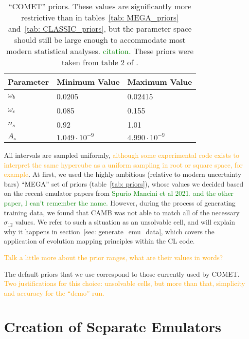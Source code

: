 \begin{table}[ht!]
\centering
\begin{tabular}{l|l|l}
\hline
Parameter & Minimum Value & Maximum Value \\ \hline
$\omega_b$ & 0.0205 & 0.02415 \\
$\omega_c$ & 0.085 & 0.155 \\
$n_s$ & 0.92 & 1.01 \\
$A_s$\footnotemark & $1.049 \cdot 10^{-9}$ & $4.990 \cdot 10^{-9}$  \\
\end{tabular}
	\cprotect\caption[``COMET'' priors]{``COMET'' priors.
	These values are significantly more restrictive than in
	tables~\ref{tab: MEGA_priors} and~\ref{tab: CLASSIC_priors},
	but the parameter space should still be large enough to accommodate
	most modern statistical analyses. \textcolor{green}{citation.}
	These priors were taken from table 2 of \citet{Eggemeier}.}
 \label{tab: COMET_priors}
\end{table}

All intervals are sampled uniformly, \textcolor{orange}{although some
experimental code exists to interpret the same hypercube as a uniform sampling
in root or square space, for example}. At first, we used the highly ambitious 
(relative to modern uncertainty bars) ``MEGA'' set of priors
(table~\ref{tab: priors}),
whose values we decided based on the recent emulator papers from
\textcolor{green}{Spurio Mancini et al 2021. and the other paper, I can't
remember the name.} However, during the process of generating training data, 
we found that CAMB was not able to match all of the necessary $\sigma_{12}$ 
values. We refer to such a situation as an unsolvable cell, and will explain
why it happens in section~\ref{sec: generate_emu_data}, which covers the
application of evolution mapping principles within the CL code.

\textcolor{orange}{Talk a little more about the prior ranges, what are their
values in words?}

The default priors that we use correspond to those currently used by COMET. 
\textcolor{orange}{Two justifications for this choice: unsolvable cells, but 
more than that, simplicity and accuracy for the ``demo'' run.}

\section{Creation of Separate Emulators}
\label{sec: 2emu_intro}

